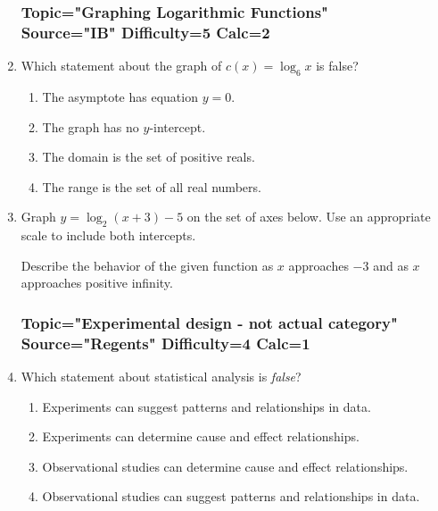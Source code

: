 \documentclass[12pt, oneside]{article}
\begin{document}
\begin{enumerate}
\subsubsection*{Topic="Graphing Logarithmic Functions"\\
Source="IB" 
Difficulty=5 
Calc=2}

\item Which statement about the graph of $c(x)= \log_6{x}$ is false?
\begin{enumerate}
    \item The asymptote has equation $y=0$.
    \item The graph has no $y$-intercept.
    \item The domain is the set of positive reals.
    \item The range is the set of all real numbers.
\end{enumerate}

\item Graph $y= \log_2(x+3)-5$ on the set of axes below. Use an appropriate scale to include both intercepts.
\begin{center}
\end{center}

Describe the behavior of the given function as $x$ approaches $-3$ and as $x$ approaches positive infinity. %

\subsubsection*{Topic="Experimental design - not actual category"\\
Source="Regents" 
Difficulty=4 
Calc=1}

\item Which statement about statistical analysis is \emph{false}?
\begin{enumerate}
    \item Experiments can suggest patterns and relationships in data.
    \item Experiments can determine cause and effect relationships.
    \item Observational studies can determine cause and effect relationships.
    \item Observational studies can suggest patterns and relationships in data.
\end{enumerate} %


\end{enumerate}
\end{document}
